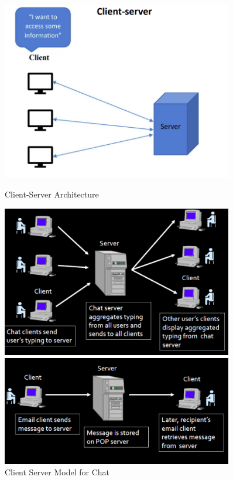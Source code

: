\documentclass{article}
\begin{document}
\begin{figure}[!ht]
    \begin{minipage}{0.45\textwidth}
        \centering
        \includegraphics[width=0.9\textwidth]{cs.png} %
        \caption{Client-Server Architecture}
    \end{minipage}\hfill
    \begin{minipage}{0.45\textwidth}
        \centering
        \includegraphics[width=0.9\textwidth]{chat.png} %
        \caption{Client Server Model for Chat}
    \end{minipage}
\vfill 
    \begin{minipage}{0.45\textwidth}
        \centering
        \includegraphics[width=0.9\textwidth]{email.png} %

\end{minipage}
\end{figure}
\end{document}
